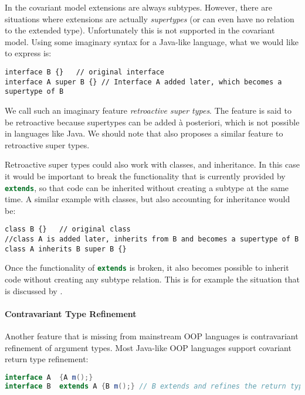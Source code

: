 In the covariant model extensions are always subtypes. However, 
there are situations where extensions are actually
\emph{supertypes} (or can even have no relation to the extended type). Unfortunately this is not supported in the
covariant model. Using some imaginary syntax for a Java-like language, 
what we would like to express is:

\begin{lstlisting}
interface B {}   // original interface
interface A super B {} // Interface A added later, which becomes a supertype of B
\end{lstlisting}

\noindent We call such an imaginary feature \emph{retroactive super types}. The
feature is said to be retroactive because supertypes can be added \`a
posteriori, which is not possible in languages like Java. We should note that
\cite{ostermann2008nominal} also proposes a similar feature to retroactive
super types.

Retroactive super types could also work with classes, and
inheritance. In this case it would be important to break the
functionality that is currently provided by \lstinline[language=java]{extends}, so that
code can be inherited without creating a subtype at the same time. 
A similar example with classes, but also accounting for inheritance 
would be:

\begin{lstlisting}
class B {}   // original class
//class A is added later, inherits from B and becomes a supertype of B
class A inherits B super B {}
\end{lstlisting}

\noindent Once the functionality of \lstinline[language=java]{extends} is broken, it also
becomes possible to inherit code without creating any subtype
relation. This is for example the situation that is discussed by \cite{cook1989inheritance}.

\paragraph{Contravariant Type Refinement}
Another feature that is missing from mainstream OOP languages is 
contravariant refinement of argument types. Most Java-like OOP languages support covariant return type 
refinement:

\begin{lstlisting}[language=java]
interface A  {A m();} 
interface B  extends A {B m();} // B extends and refines the return type of m() to a subtype
\end{lstlisting}


